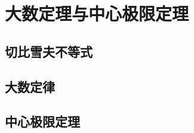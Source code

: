\chapter{大数定理与中心极限定理}

\section{切比雪夫不等式}
\label{sec:切比雪夫不等式}

\section{大数定律}
\label{sec:大数定律}

\section{中心极限定理}
\label{sec:中心极限定理}


